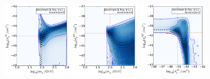 \begin{figure}[!ht]
  \includegraphics[width=0.32\textwidth]{NT/BenchmarkB_poly-mx_sigsi.pdf}
  \includegraphics[width=0.32\textwidth]{NT/BenchmarkB_poly-mx_sigsd.pdf}
  \includegraphics[width=0.32\textwidth]{NT/BenchmarkB_poly-sigsi_sigsd.pdf}


\end{figure}
